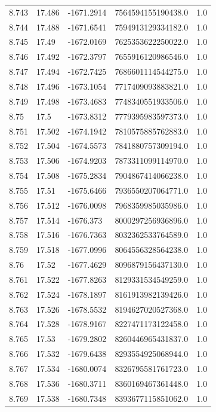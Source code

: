 \begin{tabular}{lllll}
8.743 & 17.486 & -1671.2914 & 7564594155190438.0 & 1.0 \\
8.744 & 17.488 & -1671.6541 & 7594913129334182.0 & 1.0 \\
8.745 & 17.49 & -1672.0169 & 7625353622250022.0 & 1.0 \\
8.746 & 17.492 & -1672.3797 & 7655916120986546.0 & 1.0 \\
8.747 & 17.494 & -1672.7425 & 7686601114544275.0 & 1.0 \\
8.748 & 17.496 & -1673.1054 & 7717409093883821.0 & 1.0 \\
8.749 & 17.498 & -1673.4683 & 7748340551933506.0 & 1.0 \\
8.75 & 17.5 & -1673.8312 & 7779395983597373.0 & 1.0 \\
8.751 & 17.502 & -1674.1942 & 7810575885762883.0 & 1.0 \\
8.752 & 17.504 & -1674.5573 & 7841880757309194.0 & 1.0 \\
8.753 & 17.506 & -1674.9203 & 7873311099114970.0 & 1.0 \\
8.754 & 17.508 & -1675.2834 & 7904867414066238.0 & 1.0 \\
8.755 & 17.51 & -1675.6466 & 7936550207064771.0 & 1.0 \\
8.756 & 17.512 & -1676.0098 & 7968359985035986.0 & 1.0 \\
8.757 & 17.514 & -1676.373 & 8000297256936896.0 & 1.0 \\
8.758 & 17.516 & -1676.7363 & 8032362533764589.0 & 1.0 \\
8.759 & 17.518 & -1677.0996 & 8064556328564238.0 & 1.0 \\
8.76 & 17.52 & -1677.4629 & 8096879156437130.0 & 1.0 \\
8.761 & 17.522 & -1677.8263 & 8129331534549259.0 & 1.0 \\
8.762 & 17.524 & -1678.1897 & 8161913982139426.0 & 1.0 \\
8.763 & 17.526 & -1678.5532 & 8194627020527368.0 & 1.0 \\
8.764 & 17.528 & -1678.9167 & 8227471173122458.0 & 1.0 \\
8.765 & 17.53 & -1679.2802 & 8260446965431837.0 & 1.0 \\
8.766 & 17.532 & -1679.6438 & 8293554925068944.0 & 1.0 \\
8.767 & 17.534 & -1680.0074 & 8326795581761723.0 & 1.0 \\
8.768 & 17.536 & -1680.3711 & 8360169467361448.0 & 1.0 \\
8.769 & 17.538 & -1680.7348 & 8393677115851062.0 & 1.0 \\

\end{tabular}
